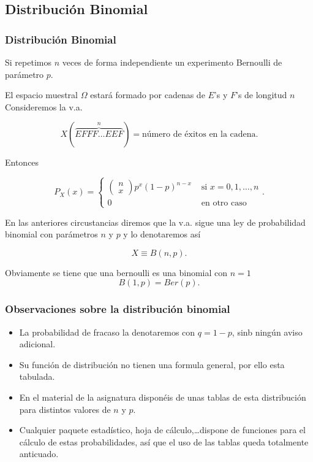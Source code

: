 \documentclass[handout]{beamer}
\renewcommand{\emph}[1]{{\color{red}#1}}
\theoremstyle{plain}
\theoremstyle{definition}
\begin{document}
 \subsection{Distribución Binomial}
\begin{frame}

\frametitle{Distribución Binomial}

Si repetimos $n$ veces de forma independiente un experimento Bernoulli de parámetro $p$.

El espacio muestral $\Omega$ estará formado por cadenas de $E$'s y $F$'s de longitud $n$
Consideremos la v.a.

$$X(\overbrace{EFFF\ldots EEF}^{n})=\mbox{número de éxitos en la cadena}.$$

Entonces

 $$P_{X}(x)=\left\{
 \begin{array}{ll}
 \left(\begin{array}{ll} n\\
    x\end{array}\right) p^x (1-p)^{n-x} &\mbox{ si } x=0,1,\ldots,n\\
    0  & \mbox{ en otro caso}
  \end{array}\right..$$

\end{frame}

\begin{frame}

    En las anteriores circustancias diremos que la v.a. sigue una \emph{ley de probabilidad binomial con parámetros $n$ y $p$} y lo denotaremos así 
    
    $$X\equiv B(n,p).$$ 
    
    Obviamente se tiene que una bernoulli es una binomial con $n=1$
    $$B(1,p)=Ber(p).$$
\end{frame}


\begin{frame}
\frametitle{Observaciones sobre la distribución binomial}
\begin{itemize}
\item La probabilidad de fracaso la denotaremos con  $q=1-p$, sinb ningún aviso adicional.
\item Su función de distribución no tienen una formula general, por ello esta tabulada.
\item En el material de la asignatura disponéis de unas tablas de esta distribución
para distintos valores de $n$ y $p$. 
\item Cualquier paquete estadístico, hoja de cálculo,\ldots dispone de
funciones para el cálculo de estas probabilidades, así que el uso de las tablas queda \emph{totalmente anticuado}. 
\end{itemize}
\end{frame}
\end{document}
